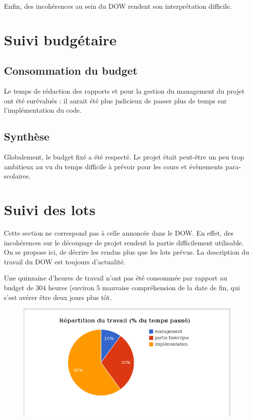 \documentclass[a4paper]{article}
\begin{document}
Enfin, des incohérences au sein du DOW rendent son interprétation difficile.

\section{Suivi budgétaire}
\subsection{Consommation du budget}
Le temps de rédaction des rapports et pour la gestion du management du projet
ont été surévalués : il aurait été plus judicieux de passer plus de temps
sur l'implémentation du code.
\subsection{Synthèse}
Globalement, le budget fixé a été respecté. Le projet était peut-être un
peu trop ambitieux au vu du temps difficile à prévoir pour les cours et
évènements para-scolaires.
\section{Suivi des lots}
Cette section ne correspond pas à celle annoncée dans le DOW. En effet, des
incohérences sur le découpage de projet rendent la partie difficilement
utilisable. On se propose ici, de décrire les rendus plus que les lots
prévus. La description du travail du DOW est toujours d'actualité.

Une quinzaine d'heures de travail n'ont pas été consommée par rapport
au budget de $304$ heures (environ $5$%
mauvaise compréhension de la date de fin, qui s'est avérer être deux
jours plus tôt.

\begin{figure}[!ht]
	\centering
	\includegraphics[scale=.5]{imgs/pie.png}
\end{figure}
\end{document}
